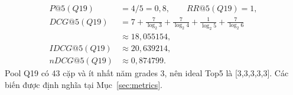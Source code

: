 \begin{align}
P@5(Q19)&=4/5=0{,}8,\qquad RR@5(Q19)=1,\\
DCG@5(Q19)&=7+\frac7{\log_2 3}+\frac7{\log_2 4}+\frac1{\log_2 5}+\frac7{\log_2 6}\\
&\approx 18{,}055154,\\
IDCG@5(Q19)&\approx 20{,}639214,\\
nDCG@5(Q19)&\approx 0{,}874799.
\end{align}
Pool Q19 có 43 cặp và ít nhất năm grades 3, nên ideal Top5 là [3,3,3,3,3]. Các biến được định nghĩa tại Mục~\ref{sec:metrics}.

